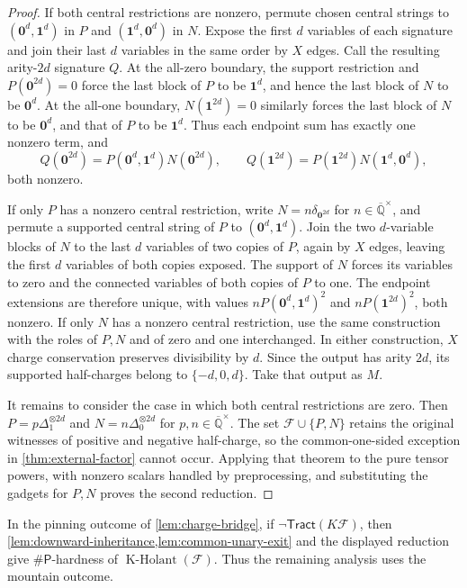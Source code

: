 \documentclass[11pt,letterpaper,onecolumn]{article}
\theoremstyle{plain}
\theoremstyle{definition}
\theoremstyle{remark}
\newcommand{\AlgNums}{\overline{\mathbb Q}}
\newcommand{\cF}{\mathcal F}
\newcommand{\KHolant}{\operatorname{K\text{-}Holant}}
\newcommand{\Tract}{\mathsf{Tract}}
\newcommand{\SharpP}{\#\mathsf P}
\newcommand{\one}{\mathbf 1}
\newcommand{\zero}{\mathbf 0}
\newcommand{\DeltaZero}{\Delta_0}
\newcommand{\DeltaOne}{\Delta_1}
\begin{document}
\begin{proof}
If both central restrictions are nonzero, permute chosen central strings to
\((\zero^d,\one^d)\) in \(P\) and \((\one^d,\zero^d)\) in \(N\).
Expose the first \(d\) variables of each signature and join their last
\(d\) variables in the same order by \(X\) edges.  Call the resulting
arity-\(2d\) signature \(Q\).  At the all-zero boundary, the support
restriction and \(P(\zero^{2d})=0\) force the last block of \(P\) to be
\(\one^d\), and hence the last block of \(N\) to be \(\zero^d\).
At the all-one boundary, \(N(\one^{2d})=0\) similarly forces the last
block of \(N\) to be \(\zero^d\), and that of \(P\) to be \(\one^d\).
Thus each endpoint sum has exactly one nonzero term, and
\[
Q(\zero^{2d})=P(\zero^d,\one^d)N(\zero^{2d}),\qquad
Q(\one^{2d})=P(\one^{2d})N(\one^d,\zero^d),
\]
both nonzero.

If only \(P\) has a nonzero central restriction, write
\(N=n\delta_{\zero^{2d}}\) for \(n\in\AlgNums^\times\), and permute a
supported central string of \(P\) to \((\zero^d,\one^d)\).  Join the two
\(d\)-variable blocks of \(N\) to the last \(d\) variables of two copies of
\(P\), again by \(X\) edges, leaving the first \(d\) variables of
both copies exposed.  The support of \(N\) forces its variables to zero
and the connected variables of both copies of \(P\) to one.  The endpoint
extensions are therefore unique, with values
\(nP(\zero^d,\one^d)^2\) and \(nP(\one^{2d})^2\), both nonzero.
If only \(N\) has a nonzero central restriction, use the same construction
with the roles of \(P,N\) and of zero and one interchanged.
In either construction, \(X\) charge conservation preserves
divisibility by \(d\).  Since the output has arity \(2d\), its supported
half-charges belong to \(\{-d,0,d\}\). Take that output as \(M\).

It remains to consider the case in which both central restrictions are zero.
Then \(P=p\DeltaOne^{\otimes2d}\) and
\(N=n\DeltaZero^{\otimes2d}\) for \(p,n\in\AlgNums^\times\).
The set \(\cF\cup\{P,N\}\) retains the original witnesses of positive and
negative half-charge, so the common-one-sided exception in
\cref{thm:external-factor} cannot occur.  Applying that theorem to the
pure tensor powers, with nonzero scalars handled by preprocessing, and
substituting the gadgets for \(P,N\) proves the second reduction.
	\end{proof}

In the pinning outcome of \cref{lem:charge-bridge}, if
\(\neg\Tract(K\cF)\), then
\cref{lem:downward-inheritance,lem:common-unary-exit} and the displayed
reduction give \(\SharpP\)-hardness of \(\KHolant(\cF)\).
Thus the remaining analysis uses the mountain outcome.
	
\end{document}
